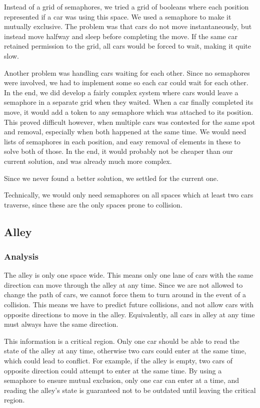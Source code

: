 Instead of a grid of semaphores, we tried a grid of booleans where each position represented if a car was using this space. We used a semaphore to make it mutually exclusive. The problem was that cars do not move instantaneously, but instead move halfway and sleep before completing the move. If the same car retained permission to the grid, all cars would be forced to wait, making it quite slow.

Another problem was handling cars waiting for each other. Since no semaphores were involved, we had to implement some so each car could wait for each other. In the end, we did develop a fairly complex system where cars would leave a semaphore in a separate grid when they waited. When a car finally completed its move, it would add a token to any semaphore which was attached to its position. This proved difficult however, when multiple cars was contested for the same spot and removal, especially when both happened at the same time. We would need lists of semaphores in each position, and easy removal of elements in these to solve both of those. In the end, it would probably not be cheaper than our current solution, and was already much more complex.

Since we never found a better solution, we settled for the current one.

Technically, we would only need semaphores on all spaces which at least two cars traverse, since these are the only spaces prone to collision.

\subsection{Alley}
\subsubsection{Analysis}
The alley is only one space wide. This means only one lane of cars with the same direction can move through the alley at any time. Since we are not allowed to change the path of cars, we cannot force them to turn around in the event of a collision. This means we have to predict future collisions, and not allow cars with opposite directions to move in the alley. Equivalently, all cars in alley at any time must always have the same direction.

This information is a critical region. Only one car should be able to read the state of the alley at any time, otherwise two cars could enter at the same time, which could lead to conflict. For example, if the alley is empty, two cars of opposite direction could attempt to enter at the same time. By using a semaphore to ensure mutual exclusion, only one car can enter at a time, and reading the alley's state is guaranteed not to be outdated until leaving the critical region.

